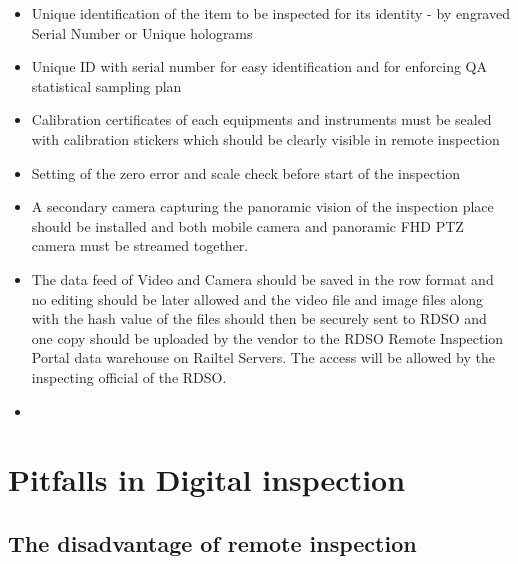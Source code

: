 \documentclass[
]{article}
\providecommand{\tightlist}{%
  \setlength{\itemsep}{0pt}\setlength{\parskip}{0pt}}
\begin{document}
\begin{itemize}
  \begin{itemize}
  \tightlist
  \item
    Unique identification of the item to be inspected for its identity -
    by engraved Serial Number or Unique holograms
  \item
    Unique ID with serial number for easy identification and for
    enforcing QA statistical sampling plan
  \item
    Calibration certificates of each equipments and instruments must be
    sealed with calibration stickers which should be clearly visible in
    remote inspection
  \item
    Setting of the zero error and scale check before start of the
    inspection
  \item
    A secondary camera capturing the panoramic vision of the inspection
    place should be installed and both mobile camera and panoramic FHD
    PTZ camera must be streamed together.
  \item
    The data feed of Video and Camera should be saved in the row format
    and no editing should be later allowed and the video file and image
    files along with the hash value of the files should then be securely
    sent to RDSO and one copy should be uploaded by the vendor to the
    RDSO Remote Inspection Portal data warehouse on Railtel Servers. The
    access will be allowed by the inspecting official of the RDSO.
  \item
  \end{itemize}
\end{itemize}

\newpage

\hypertarget{pitfalls-in-digital-inspection}{%
\section{Pitfalls in Digital
inspection}\label{pitfalls-in-digital-inspection}}

\hypertarget{the-disadvantage-of-remote-inspection}{%
\subsection{The disadvantage of remote
inspection}\label{the-disadvantage-of-remote-inspection}}
\end{document}
